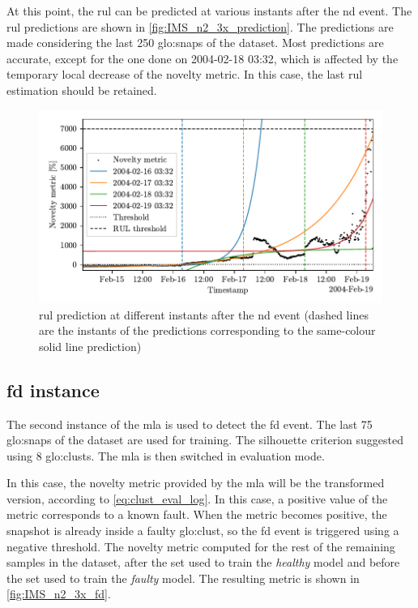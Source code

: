 At this point, the \gls{rul} can be predicted at various instants after the \gls{nd} event. The \gls{rul} predictions are shown in \autoref{fig:IMS_n2_3x_prediction}. The predictions are made considering the last 250 \gls{glo:snap}s of the dataset. Most predictions are accurate, except for the one done on 2004-02-18 03:32, which is affected by the temporary local decrease of the novelty metric. In this case, the last \gls{rul} estimation should be retained.

\begin{figure}
    \centering
    \includegraphics[width=\textwidth]{images/IMS/Test02/RUL.pdf}
    \caption{\gls{rul} prediction at different instants after the \gls{nd} event (dashed lines are the instants of the predictions corresponding to the same-colour solid line prediction)}
    \label{fig:IMS_n2_3x_prediction}
\end{figure}

\subsection{\gls{fd} instance}
The second instance of the \gls{mla} is used to detect the \gls{fd} event. The last 75 \gls{glo:snap}s of the dataset are used for training. The silhouette criterion suggested using 8 \gls{glo:clust}s. The \gls{mla} is then switched in evaluation mode. 

In this case, the novelty metric provided by the \gls{mla} will be the transformed version, according to \autoref{eq:clust_eval_log}. In this case, a positive value of the metric corresponds to a known fault. When the metric becomes positive, the snapshot is already inside a faulty \gls{glo:clust}, so the \gls{fd} event is triggered using a negative threshold. The novelty metric computed for the rest of the remaining samples in the dataset, after the set used to train the \emph{healthy} model and before the set used to train the \emph{faulty} model. The resulting metric is shown in \autoref{fig:IMS_n2_3x_fd}.

